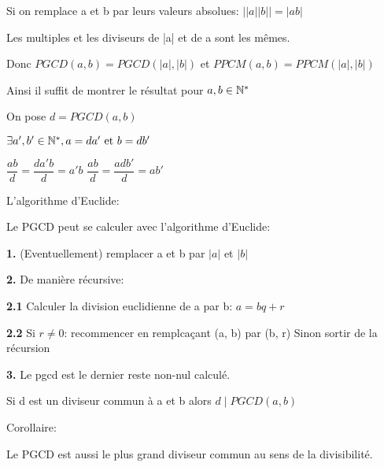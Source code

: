 \documentclass[a4paper, 12pt]{article}
\begin{document}
\begin{demonstration}
    Si on remplace a et b par leurs valeurs absolues: $||a||b|| = |ab|$

    Les multiples et les diviseurs de |a| et de a sont les mêmes.

    Donc $PGCD(a, b) = PGCD(|a|, |b|)$ et $PPCM(a, b) = PPCM(|a|, |b|)$

    Ainsi il suffit de montrer le résultat pour $a, b \in \mathbb{N}^*$

    On pose $d = PGCD(a, b)$

    $\exists a', b' \in \mathbb{N}^*, a = da' \text{ et } b = db'$

    $\dfrac{ab}{d} = \dfrac{da'b}{d} = a'b$
    $\dfrac{ab}{d} = \dfrac{adb'}{d} = ab'$
\end{demonstration}

\begin{methode}
L'algorithme d'Euclide:

Le PGCD peut se calculer avec l'algorithme d'Euclide:

\item \textbf{1.} (Eventuellement) remplacer a et b par $|a|$ et $|b|$
\item \textbf{2.} De manière récursive:
\item \textbf{2.1} Calculer la division euclidienne de a par b: $a = bq + r$
\item \textbf{2.2} Si $r \neq 0$: recommencer en remplcaçant (a, b) par (b, r) Sinon sortir de la récursion
\item \textbf{3.} Le pgcd est le dernier reste non-nul calculé.
\end{methode}


\begin{proposition}
    Si d est un diviseur commun à a et b alors $d \mid PGCD(a, b)$
\end{proposition}

Corollaire:

Le PGCD est aussi le plus grand diviseur commun au sens de la divisibilité.
\end{document}
